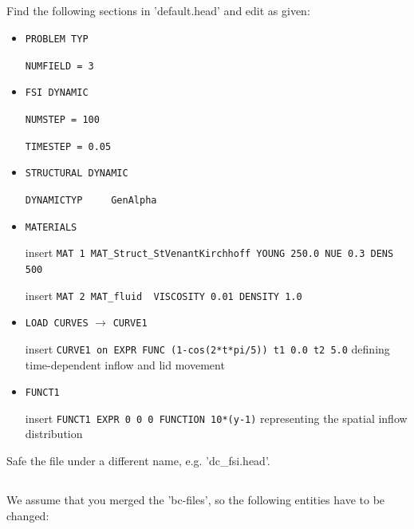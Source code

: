 \subsection{\head}
Find the following sections in 'default.head' and edit as given:
\begin{itemize}
 \item \verb|PROBLEM TYP|

 \verb|NUMFIELD = 3|
 \item \verb|FSI DYNAMIC|

 \verb|NUMSTEP = 100|

 \verb|TIMESTEP = 0.05|

 \item \verb|STRUCTURAL DYNAMIC|

 \verb|DYNAMICTYP     GenAlpha|

 \item \verb|MATERIALS|

  insert \verb|MAT 1 MAT_Struct_StVenantKirchhoff YOUNG 250.0 NUE 0.3 DENS 500|
  
  insert \verb|MAT 2 MAT_fluid  VISCOSITY 0.01 DENSITY 1.0|

  \item \verb|LOAD CURVES| $\to$ \verb|CURVE1|

  insert \verb|CURVE1 on EXPR FUNC (1-cos(2*t*pi/5)) t1 0.0 t2 5.0| defining time-dependent inflow and lid movement
 
   \item \verb|FUNCT1|

  insert \verb|FUNCT1 EXPR 0 0 0 FUNCTION 10*(y-1)| representing the spatial inflow distribution

\end{itemize}
Safe the file under a different name, e.g. 'dc\_fsi.head'.

\subsection{\bc}
We assume that you merged the 'bc-files', so the following entities have to be changed:

